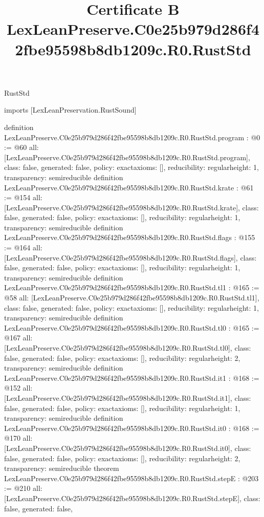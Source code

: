 \begin{lexlean}{RustStd}
\title{Certificate B LexLeanPreserve.C0e25b979d286f42fbe95598b8db1209c.R0.RustStd}
\begin{coremodule}
imports [LexLeanPreservation.RustSound]

definition LexLeanPreserve.C0e25b979d286f42fbe95598b8db1209c.R0.RustStd.program : @0 := @60 {
  all: [LexLeanPreserve.C0e25b979d286f42fbe95598b8db1209c.R0.RustStd.program],
  class: false,
  generated: false,
  policy: exact{axioms: []},
  reducibility: regular{height: 1},
  transparency: semireducible
}
definition LexLeanPreserve.C0e25b979d286f42fbe95598b8db1209c.R0.RustStd.krate : @61 := @154 {
  all: [LexLeanPreserve.C0e25b979d286f42fbe95598b8db1209c.R0.RustStd.krate],
  class: false,
  generated: false,
  policy: exact{axioms: []},
  reducibility: regular{height: 1},
  transparency: semireducible
}
definition LexLeanPreserve.C0e25b979d286f42fbe95598b8db1209c.R0.RustStd.flags : @155 := @164 {
  all: [LexLeanPreserve.C0e25b979d286f42fbe95598b8db1209c.R0.RustStd.flags],
  class: false,
  generated: false,
  policy: exact{axioms: []},
  reducibility: regular{height: 1},
  transparency: semireducible
}
definition LexLeanPreserve.C0e25b979d286f42fbe95598b8db1209c.R0.RustStd.tl1 : @165 := @58 {
  all: [LexLeanPreserve.C0e25b979d286f42fbe95598b8db1209c.R0.RustStd.tl1],
  class: false,
  generated: false,
  policy: exact{axioms: []},
  reducibility: regular{height: 1},
  transparency: semireducible
}
definition LexLeanPreserve.C0e25b979d286f42fbe95598b8db1209c.R0.RustStd.tl0 : @165 := @167 {
  all: [LexLeanPreserve.C0e25b979d286f42fbe95598b8db1209c.R0.RustStd.tl0],
  class: false,
  generated: false,
  policy: exact{axioms: []},
  reducibility: regular{height: 2},
  transparency: semireducible
}
definition LexLeanPreserve.C0e25b979d286f42fbe95598b8db1209c.R0.RustStd.it1 : @168 := @152 {
  all: [LexLeanPreserve.C0e25b979d286f42fbe95598b8db1209c.R0.RustStd.it1],
  class: false,
  generated: false,
  policy: exact{axioms: []},
  reducibility: regular{height: 1},
  transparency: semireducible
}
definition LexLeanPreserve.C0e25b979d286f42fbe95598b8db1209c.R0.RustStd.it0 : @168 := @170 {
  all: [LexLeanPreserve.C0e25b979d286f42fbe95598b8db1209c.R0.RustStd.it0],
  class: false,
  generated: false,
  policy: exact{axioms: []},
  reducibility: regular{height: 2},
  transparency: semireducible
}
theorem LexLeanPreserve.C0e25b979d286f42fbe95598b8db1209c.R0.RustStd.stepE : @203 := @210 {
  all: [LexLeanPreserve.C0e25b979d286f42fbe95598b8db1209c.R0.RustStd.stepE],
  class: false,
  generated: false,
}
\end{coremodule}
\end{lexlean}
